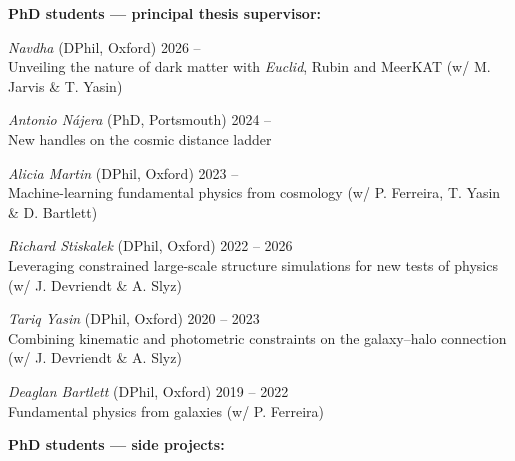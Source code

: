 \documentclass[11pt]{article}
\begin{document}
\textbf{PhD students --- principal thesis supervisor:}

\vspace{0.4\baselineskip}

\textit{Navdha} (DPhil, Oxford) \hfill 2026 --\\
Unveiling the nature of dark matter with \textit{Euclid}, Rubin and MeerKAT (w/ M. Jarvis \& T. Yasin)\\

\vspace{-0.5\baselineskip}

\textit{Antonio N\'{a}jera} (PhD, Portsmouth) \hfill 2024 --\\
New handles on the cosmic distance ladder\\

\vspace{-0.5\baselineskip}

\textit{Alicia Martin} (DPhil, Oxford) \hfill 2023 --\\
Machine-learning fundamental physics from cosmology (w/ P. Ferreira, T. Yasin \& D. Bartlett)\\

\vspace{-0.5\baselineskip}

\textit{Richard Stiskalek} (DPhil, Oxford) \hfill 2022 -- 2026\\
Leveraging constrained large-scale structure simulations for new tests of physics (w/ J. Devriendt \& A. Slyz)\\

\vspace{-0.5\baselineskip}

\textit{Tariq Yasin} (DPhil, Oxford) \hfill 2020 -- 2023\\
Combining kinematic and photometric constraints on the galaxy--halo connection\\ (w/ J. Devriendt \& A. Slyz)\\

\vspace{-0.5\baselineskip}

\textit{Deaglan Bartlett} (DPhil, Oxford) \hfill 2019 -- 2022\\
Fundamental physics from galaxies (w/ P. Ferreira)\\

\vspace{0.5\baselineskip}

\textbf{PhD students --- side projects:}

\vspace{0.4\baselineskip}
\end{document}
